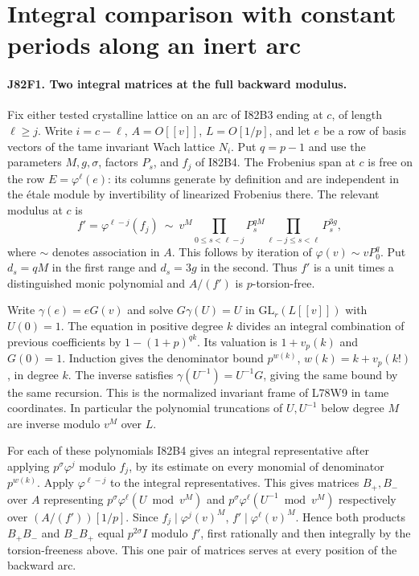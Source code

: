 \section{Integral comparison with constant periods along an inert arc}

\paragraph{J82F1. Two integral matrices at the full backward modulus.}
Fix either tested crystalline lattice on an arc of I82B3 ending
at $c$, of length $\ell\ge j$. Write $i=c-\ell$, $A=O[[v]]$,
$L=O[1/p]$, and let $e$ be a row of basis vectors of the tame
invariant Wach lattice $N_i$. Put $q=p-1$ and use the parameters
$M,g,\sigma$, factors $P_s$, and $f_j$ of I82B4. The
Frobenius span at $c$ is free on the row $E=\varphi^\ell(e)$:
its columns generate by definition and are independent in the
\'etale module by invertibility of linearized Frobenius there.
The relevant modulus at $c$ is
\[
  f'=\varphi^{\ell-j}(f_j)
  \ \sim\ v^M\!\prod_{0\le s<\ell-j}P_s^{qM}
                 \prod_{\ell-j\le s<\ell}P_s^{3g},
\]
where $\sim$ denotes association in $A$. This follows by
iteration of $\varphi(v)\sim vP_0^q$. Put $d_s=qM$ in the
first range and $d_s=3g$ in the second. Thus $f'$ is a unit
times a distinguished monic polynomial and $A/(f')$ is
$p$-torsion-free.

Write $\gamma(e)=eG(v)$ and solve $G\gamma(U)=U$ in
$\mathrm{GL}_r(L[[v]])$ with $U(0)=1$. The equation in
positive degree $k$ divides an integral combination of previous
coefficients by $1-(1+p)^{qk}$. Its valuation is $1+v_p(k)$
and $G(0)=1$. Induction gives the denominator bound
$p^{w(k)}$, $w(k)=k+v_p(k!)$, in degree $k$.
The inverse satisfies $\gamma(U^{-1})=U^{-1}G$, giving the
same bound by the same recursion. This is the normalized
invariant frame of L78W9 in tame coordinates. In particular
the polynomial truncations of $U,U^{-1}$ below degree $M$
are inverse modulo $v^M$ over $L$.

For each of these polynomials I82B4 gives an integral
representative after applying $p^\sigma\varphi^j$ modulo $f_j$,
by its estimate on every monomial of denominator $p^{w(k)}$.
Apply $\varphi^{\ell-j}$ to the integral representatives.
This gives matrices $B_+,B_-$ over $A$ representing
$p^\sigma\varphi^\ell(U\bmod v^M)$ and
$p^\sigma\varphi^\ell(U^{-1}\bmod v^M)$ respectively
over $(A/(f'))[1/p]$. Since $f_j\mid\varphi^j(v)^M$,
$f'\mid\varphi^\ell(v)^M$. Hence both products
$B_+B_-$ and $B_-B_+$ equal $p^{2\sigma}I$ modulo $f'$,
first rationally and then integrally by the torsion-freeness
above. This one pair of matrices serves at every position
of the backward arc.

